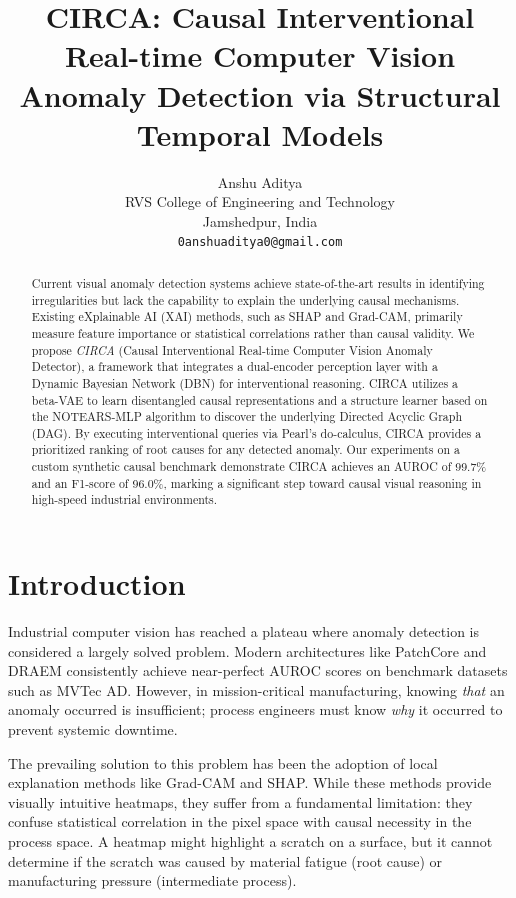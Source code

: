 \documentclass{article}
\title{CIRCA: Causal Interventional Real-time Computer Vision Anomaly Detection via Structural Temporal Models}
\author{%
  Anshu Aditya \\
  RVS College of Engineering and Technology \\
  Jamshedpur, India \\
  \texttt{0anshuaditya0@gmail.com} \\
}
\begin{document}
\maketitle

\begin{abstract}
Current visual anomaly detection systems achieve state-of-the-art results in identifying irregularities but lack the capability to explain the underlying causal mechanisms. Existing eXplainable AI (XAI) methods, such as SHAP and Grad-CAM, primarily measure feature importance or statistical correlations rather than causal validity. We propose \emph{CIRCA} (Causal Interventional Real-time Computer Vision Anomaly Detector), a framework that integrates a dual-encoder perception layer with a Dynamic Bayesian Network (DBN) for interventional reasoning. CIRCA utilizes a beta-VAE to learn disentangled causal representations and a structure learner based on the NOTEARS-MLP algorithm to discover the underlying Directed Acyclic Graph (DAG). By executing interventional queries via Pearl's do-calculus, CIRCA provides a prioritized ranking of root causes for any detected anomaly. Our experiments on a custom synthetic causal benchmark demonstrate CIRCA achieves an AUROC of 99.7\% and an F1-score of 96.0\%, marking a significant step toward causal visual reasoning in high-speed industrial environments.
\end{abstract}

\section{Introduction}
Industrial computer vision has reached a plateau where anomaly detection is considered a largely solved problem. Modern architectures like PatchCore and DRAEM consistently achieve near-perfect AUROC scores on benchmark datasets such as MVTec AD. However, in mission-critical manufacturing, knowing \emph{that} an anomaly occurred is insufficient; process engineers must know \emph{why} it occurred to prevent systemic downtime. 

The prevailing solution to this problem has been the adoption of local explanation methods like Grad-CAM and SHAP. While these methods provide visually intuitive heatmaps, they suffer from a fundamental limitation: they confuse statistical correlation in the pixel space with causal necessity in the process space. A heatmap might highlight a scratch on a surface, but it cannot determine if the scratch was caused by material fatigue (root cause) or manufacturing pressure (intermediate process).
\end{document}
